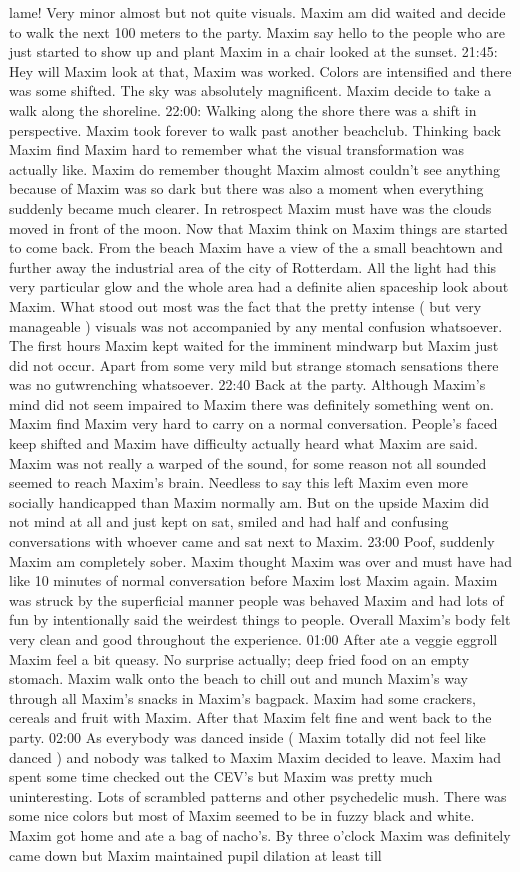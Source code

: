 \documentclass[12pt]{book}
\begin{document}
lame! Very minor almost but not quite visuals. Maxim am did waited and decide to walk the next 100 meters to the party. Maxim say hello to the people who are just started to show up and plant Maxim in a chair looked at the sunset. 21:45: Hey will Maxim look at that, Maxim was worked. Colors are intensified and there was some shifted. The sky was absolutely magnificent. Maxim decide to take a walk along the shoreline. 22:00: Walking along the shore there was a shift in perspective. Maxim took forever to walk past another beachclub. Thinking back Maxim find Maxim hard to remember what the visual transformation was actually like. Maxim do remember thought Maxim almost couldn't see anything because of Maxim was so dark but there was also a moment when everything suddenly became much clearer. In retrospect Maxim must have was the clouds moved in front of the moon. Now that Maxim think on Maxim things are started to come back. From the beach Maxim have a view of the a small beachtown and further away the industrial area of the city of Rotterdam. All the light had this very particular glow and the whole area had a definite alien spaceship look about Maxim. What stood out most was the fact that the pretty intense ( but very manageable ) visuals was not accompanied by any mental confusion whatsoever. The first hours Maxim kept waited for the imminent mindwarp but Maxim just did not occur. Apart from some very mild but strange stomach sensations there was no gutwrenching whatsoever. 22:40 Back at the party. Although Maxim's mind did not seem impaired to Maxim there was definitely something went on. Maxim find Maxim very hard to carry on a normal conversation. People's faced keep shifted and Maxim have difficulty actually heard what Maxim are said. Maxim was not really a warped of the sound, for some reason not all sounded seemed to reach Maxim's brain. Needless to say this left Maxim even more socially handicapped than Maxim normally am. But on the upside Maxim did not mind at all and just kept on sat, smiled and had half and confusing conversations with whoever came and sat next to Maxim. 23:00 Poof, suddenly Maxim am completely sober. Maxim thought Maxim was over and must have had like 10 minutes of normal conversation before Maxim lost Maxim again. Maxim was struck by the superficial manner people was behaved Maxim and had lots of fun by intentionally said the weirdest things to people. Overall Maxim's body felt very clean and good throughout the experience. 01:00 After ate a veggie eggroll Maxim feel a bit queasy. No surprise actually; deep fried food on an empty stomach. Maxim walk onto the beach to chill out and munch Maxim's way through all Maxim's snacks in Maxim's bagpack. Maxim had some crackers, cereals and fruit with Maxim. After that Maxim felt fine and went back to the party. 02:00 As everybody was danced inside ( Maxim totally did not feel like danced ) and nobody was talked to Maxim Maxim decided to leave. Maxim had spent some time checked out the CEV's but Maxim was pretty much uninteresting. Lots of scrambled patterns and other psychedelic mush. There was some nice colors but most of Maxim seemed to be in fuzzy black and white. Maxim got home and ate a bag of nacho's. By three o'clock Maxim was definitely came down but Maxim maintained pupil dilation at least till 
\end{document}
